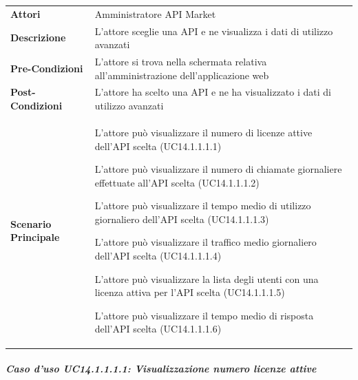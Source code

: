 \begin{minipage}{\linewidth}
	\begin{tabular}{ l | p{11cm}}
		\hline
		\rowcolor{Gray}
		\multicolumn{2}{c}{UC14.1.1.1 - Visualizzazione dati di utilizzo avanzati} \\
		\hline
		\textbf{Attori} &  Amministratore API Market \\
		\textbf{Descrizione} & L'attore sceglie una API e ne visualizza i dati di utilizzo avanzati \\
		\textbf{Pre-Condizioni} & L'attore si trova nella schermata relativa all'amministrazione dell'applicazione web \\
		\textbf{Post-Condizioni} & L'attore ha scelto una API e ne ha visualizzato i dati di utilizzo avanzati \\
		\textbf{Scenario Principale} & 
		\begin{enumerate*}[label=(\arabic*.),itemjoin={\newline}]
			\item L'attore può visualizzare il numero di licenze attive dell'API scelta (UC14.1.1.1.1)
			\item L'attore può visualizzare il numero di chiamate giornaliere effettuate all'API scelta (UC14.1.1.1.2)
			\item L'attore può visualizzare il tempo medio di utilizzo giornaliero dell'API scelta (UC14.1.1.1.3)
			\item L'attore può visualizzare il traffico medio giornaliero dell'API scelta (UC14.1.1.1.4)
			\item L'attore può visualizzare la lista degli utenti con una licenza attiva per l'API scelta (UC14.1.1.1.5)
			\item L'attore può visualizzare il tempo medio di risposta dell'API scelta (UC14.1.1.1.6)
		\end{enumerate*}\\
	\end{tabular}
\end{minipage}

\subparagraph{Caso d'uso UC14.1.1.1.1: Visualizzazione numero licenze attive}
\label{UC14_1_1_1_1}

